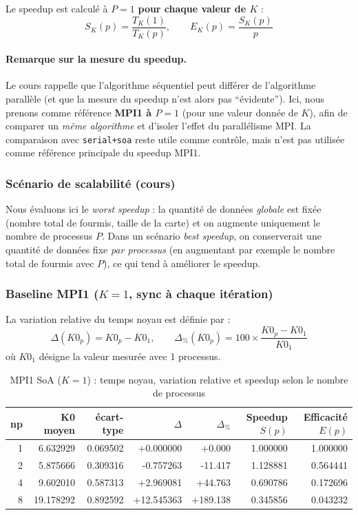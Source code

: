 Le speedup est calculé à \(P=1\) \textbf{pour chaque valeur de \(K\)} :
\[
S_K(p)=\frac{T_K(1)}{T_K(p)}, \qquad E_K(p)=\frac{S_K(p)}{p}
\]

\paragraph{Remarque sur la mesure du speedup.}
Le cours rappelle que l'algorithme séquentiel peut différer de l'algorithme parallèle
(et que la mesure du speedup n'est alors pas ``évidente'').
Ici, nous prenons comme référence \textbf{MPI1 à \(P=1\)} (pour une valeur donnée de \(K\)),
afin de comparer un \emph{même algorithme} et d'isoler l'effet du parallélisme MPI.
La comparaison avec \texttt{serial+soa} reste utile comme contrôle, mais n'est pas utilisée
comme référence principale du speedup MPI1.

\subsubsection{Scénario de scalabilité (cours)}

Nous évaluons ici le \emph{worst speedup} : la quantité de données \emph{globale} est fixée
(nombre total de fourmis, taille de la carte) et on augmente uniquement le nombre de processus \(P\).
Dans un scénario \emph{best speedup}, on conserverait une quantité de données fixe \emph{par processus}
(en augmentant par exemple le nombre total de fourmis avec \(P\)), ce qui tend à améliorer
le speedup.

\subsubsection{Baseline MPI1 (\(K=1\), sync à chaque itération)}

La variation relative du temps noyau est définie par :
\[
\Delta(K0_p)=K0_p-K0_1,
\qquad
\Delta_{\%}(K0_p)=100\times\frac{K0_p-K0_1}{K0_1}
\]
où \(K0_1\) désigne la valeur mesurée avec 1 processus.

\begin{table}[H]
\centering
\scriptsize
\caption{MPI1 SoA (\(K=1\)) : temps noyau, variation relative et speedup selon le nombre de processus}
\label{tab:mpi1-speedup-k1}
\begin{tabular}{@{}rrrrrrr@{}}
\toprule
\textbf{np} & \textbf{K0 moyen} & \textbf{écart-type} & \textbf{\(\Delta\)} & \textbf{\(\Delta_{\%}\)} & \textbf{Speedup \(S(p)\)} & \textbf{Efficacité \(E(p)\)} \\
\midrule
1 & 6.632929 & 0.069502 & +0.000000 & +0.000 & 1.000000 & 1.000000 \\
2 & 5.875666 & 0.309316 & -0.757263 & -11.417 & 1.128881 & 0.564441 \\
4 & 9.602010 & 0.587313 & +2.969081 & +44.763 & 0.690786 & 0.172696 \\
8 & 19.178292 & 0.892592 & +12.545363 & +189.138 & 0.345856 & 0.043232 \\
\bottomrule
\end{tabular}
\end{table}


